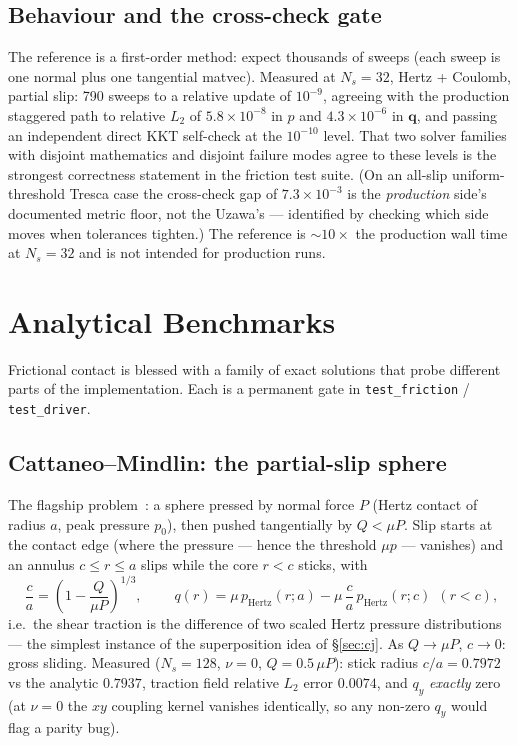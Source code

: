 \documentclass[11pt,a4paper]{article}
\newcommand{\bq}{\mathbf{q}}
\newcommand{\code}[1]{\texttt{#1}}
\begin{document}
\subsection{Behaviour and the cross-check gate}

The reference is a first-order method: expect thousands of sweeps
(each sweep is one normal plus one tangential matvec). Measured at
$N_s = 32$, Hertz + Coulomb, partial slip: 790 sweeps to a relative update
of $10^{-9}$, agreeing with the production staggered path to relative
$L_2$ of $5.8\times10^{-8}$ in $p$ and $4.3\times10^{-6}$ in $\bq$, and
passing an independent direct KKT self-check at the $10^{-10}$ level.
That two solver families with disjoint mathematics and disjoint failure
modes agree to these levels is the strongest correctness statement in the
friction test suite. (On an all-slip uniform-threshold Tresca case the
cross-check gap of $7.3\times10^{-3}$ is the \emph{production} side's
documented metric floor, not the Uzawa's --- identified by checking which
side moves when tolerances tighten.) The reference is $\sim 10\times$ the
production wall time at $N_s = 32$ and is not intended for production runs.

\section{Analytical Benchmarks}
\label{sec:benchmarks}

Frictional contact is blessed with a family of exact solutions that probe
different parts of the implementation. Each is a permanent gate in
\code{test\_friction} / \code{test\_driver}.

\subsection{Cattaneo--Mindlin: the partial-slip sphere}
\label{sec:cm}

The flagship problem~\cite{Cattaneo1938,Mindlin1949,Johnson1985}: a sphere
pressed by normal force $P$ (Hertz contact of radius $a$, peak pressure
$p_0$), then pushed tangentially by $Q < \mu P$. Slip starts at the contact
edge (where the pressure --- hence the threshold $\mu p$ --- vanishes) and
an annulus $c \le r \le a$ slips while the core $r < c$ sticks, with
\begin{equation}
  \boxed{\;
  \frac{c}{a} = \left( 1 - \frac{Q}{\mu P} \right)^{1/3},
  \;}
  \qquad
  q(r) = \mu\, p_{\mathrm{Hertz}}(r; a)
       - \mu\, \frac{c}{a}\, p_{\mathrm{Hertz}}\!\left(r; c\right)
       \ \ (r < c),
\end{equation}
i.e.\ the shear traction is the difference of two scaled Hertz pressure
distributions --- the simplest instance of the superposition idea of
\S\ref{sec:cj}. As $Q \to \mu P$, $c \to 0$: gross sliding. Measured
($N_s = 128$, $\nu = 0$, $Q = 0.5\,\mu P$): stick radius $c/a = 0.7972$ vs
the analytic $0.7937$, traction field relative $L_2$ error $0.0074$, and
$q_y$ \emph{exactly} zero (at $\nu = 0$ the $xy$ coupling kernel vanishes
identically, so any non-zero $q_y$ would flag a parity bug).
\end{document}
